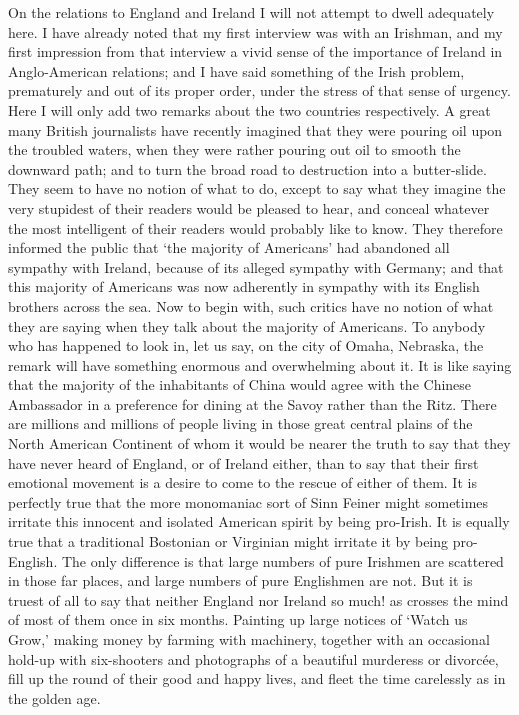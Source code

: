 \documentclass{book}
\begin{document}
On the relations to England and Ireland I will not attempt to dwell adequately here. I have already noted that my first interview was with an Irishman, and my first impression from that interview a vivid sense of the importance of Ireland in Anglo-American relations; and I have said something of the Irish problem, prematurely and out of its proper order, under the stress of that sense of urgency. Here I will only add two remarks about the two countries respectively. A great many British journalists have recently imagined that they were pouring oil upon the troubled waters, when they were rather pouring out oil to smooth the downward path; and to turn the broad road to destruction into a butter-slide. They seem to have no notion of what to do, except to say what they imagine the very stupidest of their readers would be pleased to hear, and conceal whatever the most intelligent of their readers would probably like to know. They therefore informed the public that ‘the majority of Americans’ had abandoned all sympathy with Ireland, because of its alleged sympathy with Germany; and that this majority of Americans was now adherently in sympathy with its English brothers across the sea. Now to begin with, such critics have no notion of what they are saying when they talk about the majority of Americans. To anybody who has happened to look in, let us say, on the city of Omaha, Nebraska, the remark will have something enormous and overwhelming about it. It is like saying that the majority of the inhabitants of China would agree with the Chinese Ambassador in a preference for dining at the Savoy rather than the Ritz. There are millions and millions of people living in those great central plains of the North American Continent of whom it would be nearer the truth to say that they have never heard of England, or of Ireland either, than to say that their first emotional movement is a desire to come to the rescue of either of them. It is perfectly true that the more monomaniac sort of Sinn Feiner might sometimes irritate this innocent and isolated American spirit by being pro-Irish. It is equally true that a traditional Bostonian or Virginian might irritate it by being pro-English. The only difference is that large numbers of pure Irishmen are scattered in those far places, and large numbers of pure Englishmen are not. But it is truest of all to say that neither England nor Ireland so much! as crosses the mind of most of them once in six months. Painting up large notices of ‘Watch us Grow,’ making money by farming with machinery, together with an occasional hold-up with six-shooters and photographs of a beautiful murderess or divorcée, fill up the round of their good and happy lives, and fleet the time carelessly as in the golden age.
\end{document}
